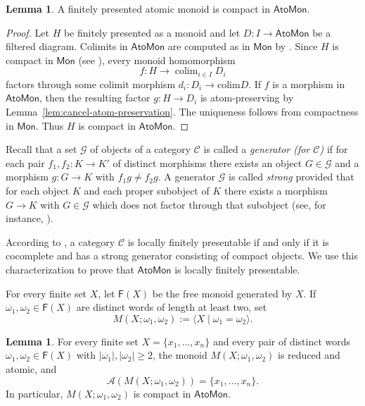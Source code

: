 \documentclass[a4paper,10pt,reqno]{amsart}
\theoremstyle{definition}
\newtheorem{lemma}[theorem]{Lemma}
\theoremstyle{remark}
\newcommand{\AtoMon}{\mathsf{AtoMon}}
\newcommand{\Mon}{\mathsf{Mon}}
\newcommand{\A}{\mathscr A}
\newcommand{\F}{\mathsf F}
\begin{document}
\begin{lemma}\label{lem:fp-monoid-compact}
A finitely presented atomic monoid is compact in $\AtoMon$.
\end{lemma}

\begin{proof}
Let $H$ be finitely presented as a monoid and let
$D:I\to\AtoMon$ be a filtered diagram.  Colimits in $\AtoMon$ are
computed as in $\Mon$ by \cite[Theorem~6.3]{CCT}.  Since $H$ is compact
in $\Mon$ (see \cite[Corollary~3.13]{AR}), every monoid homomorphism
$$
  f:H\to\mathop{\mathrm{colim}}_{i\in I}D_i
$$
factors through some colimit morphism $d_i:D_i\to\mathrm{colim}D$.
If $f$ is a morphism in $\AtoMon$, then the resulting factor
$g:H\to D_i$ is atom-preserving by Lemma~\ref{lem:cancel-atom-preservation}.  The uniqueness follows from compactness in $\Mon$.  Thus $H$ is compact in $\AtoMon$.
\end{proof}

Recall that a set $\mathcal G$ of objects of a category $\mathcal C$ is called a {\em generator (for $\mathcal C$)} if for each pair $f_1, f_2\colon K\to K'$ of distinct morphisms there exists an object $G \in \mathcal G$ and a morphism $g \colon G\to K$ with $f_1g\neq f_2 g$.
A generator $\mathcal G$ is called {\em strong} provided that for each object $K$ and each proper subobject of $K$ there exists a morphism $G\to K$ with $G \in \mathcal G$ which does not factor through that subobject (see, for instance, \cite{AR}). 

According to \cite[Theorem~1.11]{AR}, a category $\mathcal C$ is locally finitely presentable if and only if it is cocomplete and has a strong generator consisting of compact objects. We use this characterization to prove that $\AtoMon$ is locally finitely presentable.

\medskip

For every finite set $X$, let $\F(X)$ be the free monoid generated by $X$. If
$\omega_1,\omega_2\in\F(X)$ are distinct words of length at least two, set
$$
  M(X;\omega_1,\omega_2):=\langle X\mid \omega_1=\omega_2\rangle.
$$

\begin{lemma}\label{lem:one-relator-atomic}
For every finite set $X=\{x_1,\dots, x_n\}$ and every pair of distinct words
$\omega_1,\omega_2\in\F(X)$ with $|\omega_1|,|\omega_2|\geq 2$, the monoid $M(X;\omega_1,\omega_2)$ is reduced
and atomic, and
$$
  \A(M(X;\omega_1,\omega_2))=\{ x_1,\ldots,x_n\}.
$$
In particular, $M(X;\omega_1,\omega_2)$ is compact in $\AtoMon$.
\end{lemma}
\end{document}
